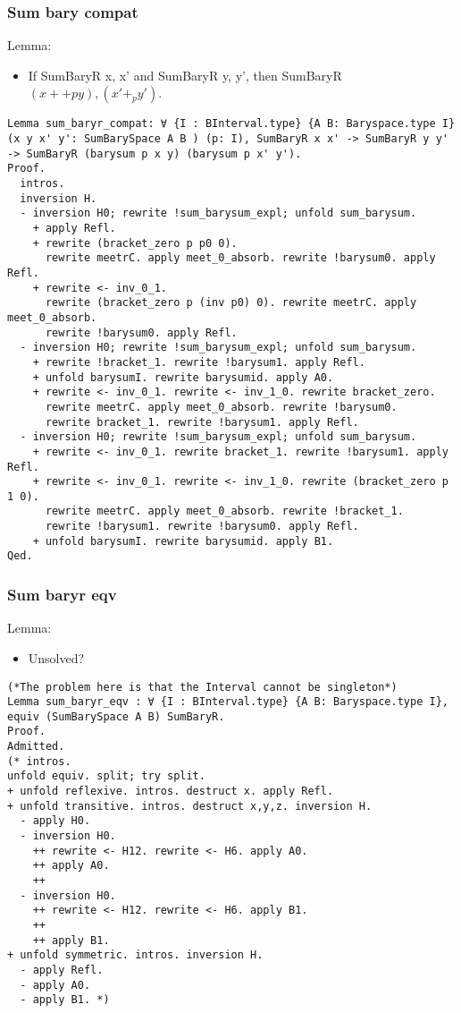 \documentclass[a4paper,10pt]{article} %
\begin{document}
\subsubsection{Sum bary compat}
Lemma:
\begin{itemize}
    \item If SumBaryR x, x' and SumBaryR y, y', then SumBaryR $(x + +py), (x' + _py')$.
\end{itemize}
\begin{lstlisting}
Lemma sum_baryr_compat: ∀ {I : BInterval.type} {A B: Baryspace.type I} (x y x' y': SumBarySpace A B ) (p: I), SumBaryR x x' -> SumBaryR y y' -> SumBaryR (barysum p x y) (barysum p x' y').
Proof.
  intros.
  inversion H.
  - inversion H0; rewrite !sum_barysum_expl; unfold sum_barysum.
    + apply Refl.
    + rewrite (bracket_zero p p0 0).
      rewrite meetrC. apply meet_0_absorb. rewrite !barysum0. apply Refl.
    + rewrite <- inv_0_1. 
      rewrite (bracket_zero p (inv p0) 0). rewrite meetrC. apply meet_0_absorb.
      rewrite !barysum0. apply Refl.
  - inversion H0; rewrite !sum_barysum_expl; unfold sum_barysum. 
    + rewrite !bracket_1. rewrite !barysum1. apply Refl.
    + unfold barysumI. rewrite barysumid. apply A0.
    + rewrite <- inv_0_1. rewrite <- inv_1_0. rewrite bracket_zero.
      rewrite meetrC. apply meet_0_absorb. rewrite !barysum0.
      rewrite bracket_1. rewrite !barysum1. apply Refl.
  - inversion H0; rewrite !sum_barysum_expl; unfold sum_barysum. 
    + rewrite <- inv_0_1. rewrite bracket_1. rewrite !barysum1. apply Refl.
    + rewrite <- inv_0_1. rewrite <- inv_1_0. rewrite (bracket_zero p 1 0).
      rewrite meetrC. apply meet_0_absorb. rewrite !bracket_1.
      rewrite !barysum1. rewrite !barysum0. apply Refl.
    + unfold barysumI. rewrite barysumid. apply B1.
Qed.
\end{lstlisting}

\subsubsection{Sum baryr eqv}
Lemma:
\begin{itemize}
    \item Unsolved?
\end{itemize}
\begin{lstlisting}
(*The problem here is that the Interval cannot be singleton*)
Lemma sum_baryr_eqv : ∀ {I : BInterval.type} {A B: Baryspace.type I}, equiv (SumBarySpace A B) SumBaryR.
Proof.
Admitted.
(* intros.
unfold equiv. split; try split.
+ unfold reflexive. intros. destruct x. apply Refl.
+ unfold transitive. intros. destruct x,y,z. inversion H.
  - apply H0. 
  - inversion H0.
    ++ rewrite <- H12. rewrite <- H6. apply A0.
    ++ apply A0.
    ++ 
  - inversion H0. 
    ++ rewrite <- H12. rewrite <- H6. apply B1.
    ++ 
    ++ apply B1.
+ unfold symmetric. intros. inversion H.
  - apply Refl.
  - apply A0.
  - apply B1. *)
\end{lstlisting}
\end{document}

